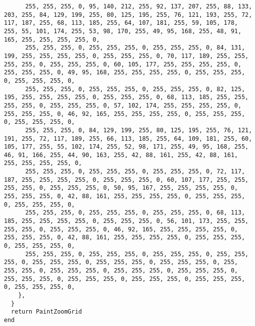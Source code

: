 \documentclass{ctexart}
\begin{document}
\begin{lstlisting}
      255, 255, 255, 0, 95, 140, 212, 255, 92, 137, 207, 255, 88, 133, 203, 255, 84, 129, 199, 255, 80, 125, 195, 255, 76, 121, 193, 255, 72, 117, 187, 255, 68, 113, 185, 255, 64, 107, 181, 255, 59, 105, 178, 255, 55, 101, 174, 255, 53, 98, 170, 255, 49, 95, 168, 255, 48, 91, 165, 255, 255, 255, 255, 0, 
      255, 255, 255, 0, 255, 255, 255, 0, 255, 255, 255, 0, 84, 131, 199, 255, 255, 255, 255, 0, 255, 255, 255, 0, 70, 117, 189, 255, 255, 255, 255, 0, 255, 255, 255, 0, 60, 105, 177, 255, 255, 255, 255, 0, 255, 255, 255, 0, 49, 95, 168, 255, 255, 255, 255, 0, 255, 255, 255, 0, 255, 255, 255, 0, 
      255, 255, 255, 0, 255, 255, 255, 0, 255, 255, 255, 0, 82, 125, 195, 255, 255, 255, 255, 0, 255, 255, 255, 0, 68, 113, 185, 255, 255, 255, 255, 0, 255, 255, 255, 0, 57, 102, 174, 255, 255, 255, 255, 0, 255, 255, 255, 0, 46, 92, 165, 255, 255, 255, 255, 0, 255, 255, 255, 0, 255, 255, 255, 0, 
      255, 255, 255, 0, 84, 129, 199, 255, 80, 125, 195, 255, 76, 121, 191, 255, 72, 117, 189, 255, 66, 113, 185, 255, 64, 109, 181, 255, 60, 105, 177, 255, 55, 102, 174, 255, 52, 98, 171, 255, 49, 95, 168, 255, 46, 91, 166, 255, 44, 90, 163, 255, 42, 88, 161, 255, 42, 88, 161, 255, 255, 255, 255, 0, 
      255, 255, 255, 0, 255, 255, 255, 0, 255, 255, 255, 0, 72, 117, 187, 255, 255, 255, 255, 0, 255, 255, 255, 0, 60, 107, 177, 255, 255, 255, 255, 0, 255, 255, 255, 0, 50, 95, 167, 255, 255, 255, 255, 0, 255, 255, 255, 0, 42, 88, 161, 255, 255, 255, 255, 0, 255, 255, 255, 0, 255, 255, 255, 0, 
      255, 255, 255, 0, 255, 255, 255, 0, 255, 255, 255, 0, 68, 113, 185, 255, 255, 255, 255, 0, 255, 255, 255, 0, 56, 101, 173, 255, 255, 255, 255, 0, 255, 255, 255, 0, 46, 92, 165, 255, 255, 255, 255, 0, 255, 255, 255, 0, 42, 88, 161, 255, 255, 255, 255, 0, 255, 255, 255, 0, 255, 255, 255, 0, 
      255, 255, 255, 0, 255, 255, 255, 0, 255, 255, 255, 0, 255, 255, 255, 0, 255, 255, 255, 0, 255, 255, 255, 0, 255, 255, 255, 0, 255, 255, 255, 0, 255, 255, 255, 0, 255, 255, 255, 0, 255, 255, 255, 0, 255, 255, 255, 0, 255, 255, 255, 0, 255, 255, 255, 0, 255, 255, 255, 0, 255, 255, 255, 0, 
    },
  }
  return PaintZoomGrid
end


\end{lstlisting}
\end{document}

